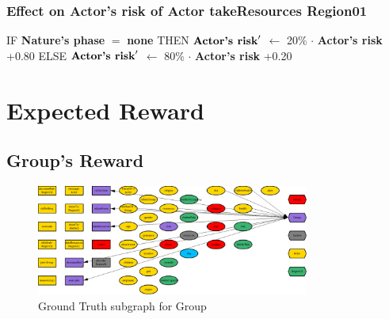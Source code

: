 \documentclass{article}%
\begin{document}
%
\subsubsection{Effect on Actor's risk of Actor takeResources Region01}%
\label{ssubsec:Effect on Actor's risk of Actor takeResources Region01}%
\begin{flushleft}%
IF %
\textbf{Nature's phase}%
$=$%
\textbf{none}%
\linebreak%
\hspace*{2em}%
THEN %
$\mbox{\textbf{Actor's risk}} '$%
$\leftarrow$%
20\%%
$\cdot$%
\textbf{Actor's risk}%
+0.80%
\linebreak%
\hspace*{2em}%
ELSE %
$\mbox{\textbf{Actor's risk}} '$%
$\leftarrow$%
80\%%
$\cdot$%
\textbf{Actor's risk}%
+0.20%
\end{flushleft}

%
\section{Expected Reward}%
\label{sec:Expected Reward}%
\subsection{Group's Reward}%
\label{subsec:Group's Reward}%


\begin{figure}[ht]%
\centering%
\includegraphics[width=0.8\textwidth]{images/Group.png}%
\caption{Ground Truth subgraph for Group}%
\end{figure}
\end{document}
